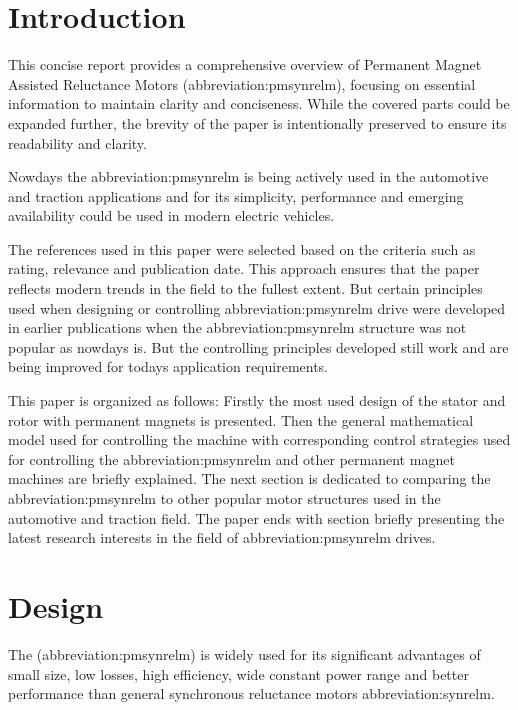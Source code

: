 \documentclass[a4paper, twoside, 11pt]{article}
\begin{document}
\section{Introduction}
This concise report provides a comprehensive overview of Permanent Magnet Assisted Reluctance Motors (\gls{abbreviation:pmsynrelm}),  focusing on essential information to maintain clarity and conciseness. While the covered parts could be expanded further, the brevity of the paper is intentionally preserved to ensure its readability and clarity.\par
Nowdays the \gls{abbreviation:pmsynrelm} is being actively used in the automotive and traction applications and for its simplicity, performance and emerging availability could be used in modern electric vehicles. \par
The references used in this paper were selected based on the criteria such as rating, relevance and publication date. This approach ensures that the paper reflects modern trends in the field to the fullest extent. But certain principles used when designing or controlling \gls{abbreviation:pmsynrelm} drive were developed in earlier publications when the \gls{abbreviation:pmsynrelm} structure was not popular as nowdays is. But the controlling principles developed still work and are being improved for todays application requirements.\par
This paper is organized as follows: Firstly the most used design of the stator and rotor with permanent magnets is presented. Then the general mathematical model used for controlling the machine with corresponding control strategies used for controlling the \gls{abbreviation:pmsynrelm} and other permanent magnet machines are briefly explained. The next section is dedicated to comparing the \gls{abbreviation:pmsynrelm} to other popular motor structures used in the automotive and traction field. The paper ends with section briefly presenting the latest research interests in the field of \gls{abbreviation:pmsynrelm} drives.

\newpage
\section{Design}
The (\gls{abbreviation:pmsynrelm}) is widely used for its significant advantages of small size, low losses, high efficiency, wide constant power range and better performance than general synchronous reluctance motors \gls{abbreviation:synrelm}. \cite{xinmin-design-of-permanent-magnet-assisted-synch-rel-m-with-low-torque-ripple,huynh-design-and-analysis-of-perm-as-synch-rel-m}
\end{document}
